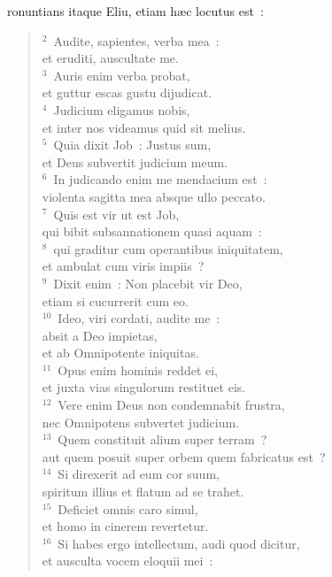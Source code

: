 \bchapter
{}ronuntians itaque Eliu, etiam h\ae c locutus est~:
\begin{flushleft}\begin{verse}\vspace{6pt}${}^{2}$~Audite, sapientes, verba mea~:\\ et eruditi, auscultate me.\\
${}^{3}$~Auris enim verba probat,\\ et guttur escas gustu dijudicat.\\
${}^{4}$~Judicium eligamus nobis,\\ et inter nos videamus quid sit melius.\\
${}^{5}$~Quia dixit Job~: Justus sum,\\ et Deus subvertit judicium meum.\\
${}^{6}$~In judicando enim me mendacium est~:\\ violenta sagitta mea absque ullo peccato.\\
${}^{7}$~Quis est vir ut est Job,\\ qui bibit subsannationem quasi aquam~:\\
${}^{8}$~qui graditur cum operantibus iniquitatem,\\ et ambulat cum viris impiis~?\\
${}^{9}$~Dixit enim~: Non placebit vir Deo,\\ etiam si cucurrerit cum eo.\\
${}^{10}$~Ideo, viri cordati, audite me~:\\ absit a Deo impietas,\\ et ab Omnipotente iniquitas.\\
${}^{11}$~Opus enim hominis reddet ei,\\ et juxta vias singulorum restituet eis.\\
${}^{12}$~Vere enim Deus non condemnabit frustra,\\ nec Omnipotens subvertet judicium.\\
${}^{13}$~Quem constituit alium super terram~?\\ aut quem posuit super orbem quem fabricatus est~?\\
${}^{14}$~Si direxerit ad eum cor suum,\\ spiritum illius et flatum ad se trahet.\\
${}^{15}$~Deficiet omnis caro simul,\\ et homo in cinerem revertetur.\\
${}^{16}$~Si habes ergo intellectum, audi quod dicitur,\\ et ausculta vocem eloquii mei~:\\

\end{verse}
\end{flushleft}
